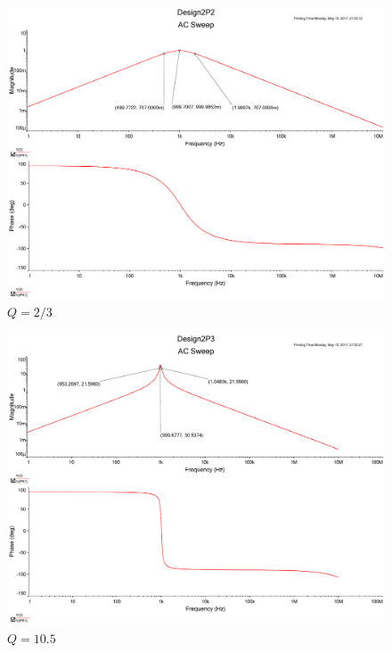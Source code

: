 \documentclass[UTF8,a4paper]{paper}
\begin{document}
\begin{figure}
\centering
\includegraphics[width=\textwidth]{2P2_3.pdf}
\caption{$Q=2/3$}
\label{PQ23}
\end{figure}
\begin{figure}
\centering
\includegraphics[width=\textwidth]{2P10_5.pdf}
\caption{$Q=10.5$}
\label{PQ10}
\end{figure}
\end{document}
